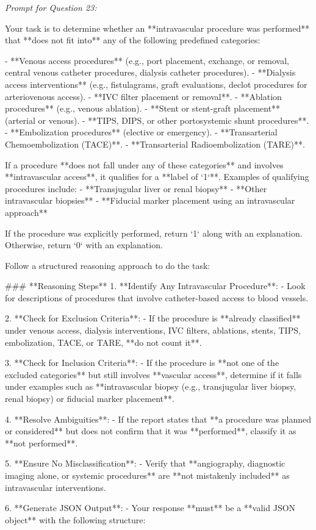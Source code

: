 \textit{\normalsize Prompt for Question  23:}
\begin{mdframed}[]
\normalsize

Your task is to determine whether an **intravascular procedure was performed** that **does not fit into** any of the following predefined categories:  

- **Venous access procedures** (e.g., port placement, exchange, or removal, central venous catheter procedures, dialysis catheter procedures).  
- **Dialysis access interventions** (e.g., fistulagrams, graft evaluations, declot procedures for arteriovenous access).  
- **IVC filter placement or removal**.  
- **Ablation procedures** (e.g., venous ablation).  
- **Stent or stent-graft placement** (arterial or venous).  
- **TIPS, DIPS, or other portosystemic shunt procedures**.  
- **Embolization procedures** (elective or emergency).  
- **Transarterial Chemoembolization (TACE)**.  
- **Transarterial Radioembolization (TARE)**.  

If a procedure **does not fall under any of these categories** and involves **intravascular access**, it qualifies for a **label of `1`**. Examples of qualifying procedures include:  
- **Transjugular liver or renal biopsy**  
- **Other intravascular biopsies**  
- **Fiducial marker placement using an intravascular approach**  

If the procedure was explicitly performed, return `1` along with an explanation. Otherwise, return `0` with an explanation.

Follow a structured reasoning approach to do the task:

### **Reasoning Steps**  
1. **Identify Any Intravascular Procedure**:  
   - Look for descriptions of procedures that involve catheter-based access to blood vessels.  

2. **Check for Exclusion Criteria**:  
   - If the procedure is **already classified** under venous access, dialysis interventions, IVC filters, ablations, stents, TIPS, embolization, TACE, or TARE, **do not count it**.  

3. **Check for Inclusion Criteria**:  
   - If the procedure is **not one of the excluded categories** but still involves **vascular access**, determine if it falls under examples such as **intravascular biopsy (e.g., transjugular liver biopsy, renal biopsy) or fiducial marker placement**.  

4. **Resolve Ambiguities**:  
   - If the report states that **a procedure was planned or considered** but does not confirm that it was **performed**, classify it as **not performed**.  

5. **Ensure No Misclassification**:  
   - Verify that **angiography, diagnostic imaging alone, or systemic procedures** are **not mistakenly included** as intravascular interventions.  

6. **Generate JSON Output**:  
   - Your response **must** be a **valid JSON object** with the following structure:  

\end{mdframed}

